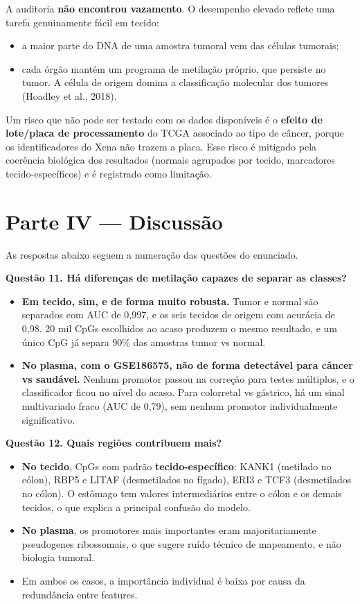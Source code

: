 \documentclass[11pt,a4paper]{article}
\providecommand{\tightlist}{\setlength{\itemsep}{0pt}\setlength{\parskip}{0pt}}
\begin{document}
A auditoria \textbf{não encontrou vazamento}. O desempenho elevado reflete uma
tarefa genuinamente fácil em tecido:

\begin{itemize}
\tightlist
\item
  a maior parte do DNA de uma amostra tumoral vem das células tumorais;
\item
  cada órgão mantém um programa de metilação próprio, que persiste no tumor. A
  célula de origem domina a classificação molecular dos tumores (Hoadley et al.,
  2018).
\end{itemize}

Um risco que não pode ser testado com os dados disponíveis é o \textbf{efeito de
lote/placa de processamento} do TCGA associado ao tipo de câncer, porque os
identificadores do Xena não trazem a placa. Esse risco é mitigado pela coerência
biológica dos resultados (normais agrupados por tecido, marcadores
tecido-específicos) e é registrado como limitação.

\section{Parte IV --- Discussão}

As respostas abaixo seguem a numeração das questões do enunciado.

\textbf{Questão 11. Há diferenças de metilação capazes de separar as classes?}

\begin{itemize}
\tightlist
\item
  \textbf{Em tecido, sim, e de forma muito robusta.} Tumor e normal são
  separados com AUC de 0,997, e os seis tecidos de origem com acurácia de 0,98.
  20 mil CpGs escolhidos ao acaso produzem o mesmo resultado, e um único CpG já
  separa 90\% das amostras tumor vs normal.
\item
  \textbf{No plasma, com o GSE186575, não de forma detectável para câncer vs
  saudável.} Nenhum promotor passou na correção para testes múltiplos, e o
  classificador ficou no nível do acaso. Para colorretal vs gástrico, há um
  sinal multivariado fraco (AUC de 0,79), sem nenhum promotor individualmente
  significativo.
\end{itemize}

\textbf{Questão 12. Quais regiões contribuem mais?}

\begin{itemize}
\tightlist
\item
  \textbf{No tecido}, CpGs com padrão \textbf{tecido-específico}: KANK1
  (metilado no cólon), RBP5 e LITAF (desmetilados no fígado), ERI3 e TCF3
  (desmetilados no cólon). O estômago tem valores intermediários entre o cólon e
  os demais tecidos, o que explica a principal confusão do modelo.
\item
  \textbf{No plasma}, os promotores mais importantes eram majoritariamente
  pseudogenes ribossomais, o que sugere ruído técnico de mapeamento, e não
  biologia tumoral.
\item
  Em ambos os casos, a importância individual é baixa por causa da redundância
  entre features.
\end{itemize}
\end{document}
